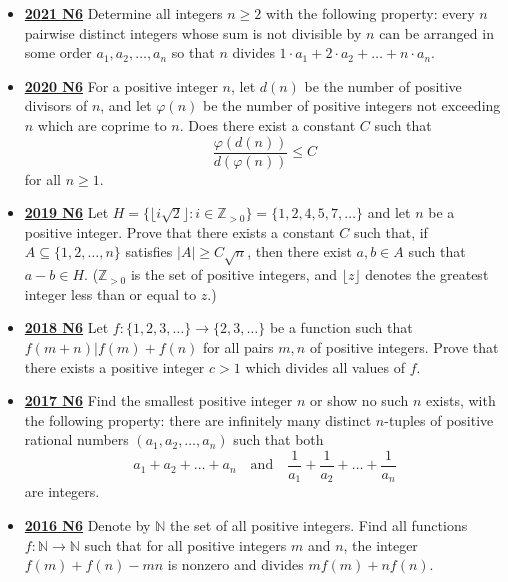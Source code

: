 \documentclass[11pt]{scrartcl}
\begin{document}
\begin{itemize}[leftmargin=*]
(For example, if $Q=\{3,7\}$, then $p(42)=3$, $q(42)=2$, $p(63)=3$, $q(63)=3$, $p(2022)=3$, $q(2022)=1$.)
\item \href{https://artofproblemsolving.com/community/c6h2882554p25627555}{\textbf{2021 N6}} Determine all integers $n\geqslant  2$ with the following property: every $n$ pairwise distinct integers whose sum is not divisible by $n$ can be arranged in some order $a_1,a_2,\dots, a_n$ so that $n$ divides $1\cdot a_1+2\cdot a_2+\dots+n\cdot a_n.$
\item \href{https://artofproblemsolving.com/community/c6h2625861p22698064}{\textbf{2020 N6}} For a positive integer $n$, let $d(n)$ be the number of positive divisors of $n$, and let $\varphi(n)$ be the number of positive integers not exceeding $n$ which are coprime to $n$. Does there exist a constant $C$ such that
$$ \frac {\varphi ( d(n))}{d(\varphi(n))}\leqslant C$$for all $n\geqslant  1$.
\item \href{https://artofproblemsolving.com/community/c6h2279051p17829382}{\textbf{2019 N6}} 	Let $H = \{ \lfloor i\sqrt{2}\rfloor : i \in \mathbb Z_{>0}\} = \{1,2,4,5,7,\dots \}$ and let $n$ be a positive integer. Prove that there exists a constant $C$ such that, if $A\subseteq \{1,2,\dots, n\}$ satisfies $|A| \geqslant  C\sqrt{n}$, then there exist $a,b\in A$ such that $a-b\in H$. ($\mathbb Z_{>0}$ is the set of positive integers, and $\lfloor z\rfloor$ denotes the greatest integer less than or equal to $z$.)
\item \href{https://artofproblemsolving.com/community/c6h1876765p12752830}{\textbf{2018 N6}} Let $f : \{ 1, 2, 3, \dots \} \to \{ 2, 3, \dots \}$ be a function such that $f(m + n) | f(m) + f(n) $ for all pairs $m,n$ of positive integers. Prove that there exists a positive integer $c > 1$ which divides all values of $f$.
\item \href{https://artofproblemsolving.com/community/c6h1671292p10632354}{\textbf{2017 N6}} Find the smallest positive integer $n$ or show no such $n$ exists, with the following property: there are infinitely many distinct $n$-tuples of positive rational numbers $(a_1, a_2, \dots, a_n)$ such that both
$$a_1+a_2+\dots +a_n \quad \text{and} \quad \frac{1}{a_1} + \frac{1}{a_2} + \dots + \frac{1}{a_n}$$are integers.
\item \href{https://artofproblemsolving.com/community/c6h1480691p8639255}{\textbf{2016 N6}} Denote by $\mathbb{N}$ the set of all positive integers. Find all functions $f:\mathbb{N}\rightarrow \mathbb{N}$ such that for all positive integers $m$ and $n$, the integer $f(m)+f(n)-mn$ is nonzero and divides $mf(m)+nf(n)$.

\end{itemize}
\end{document}
